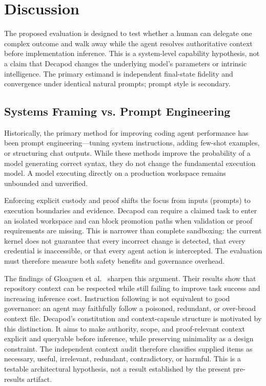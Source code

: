 \section{Discussion}
\label{sec:discussion}

The proposed evaluation is designed to test whether a human can delegate one complex outcome and walk away while the agent resolves authoritative context before implementation inference. This is a system-level capability hypothesis, not a claim that Decapod changes the underlying model's parameters or intrinsic intelligence. The primary estimand is independent final-state fidelity and convergence under identical natural prompts; prompt style is secondary.

\subsection{Systems Framing vs. Prompt Engineering}
Historically, the primary method for improving coding agent performance has been prompt engineering—tuning system instructions, adding few-shot examples, or structuring chat outputs. While these methods improve the probability of a model generating correct syntax, they do not change the fundamental execution model. A model executing directly on a production workspace remains unbounded and unverified.

Enforcing explicit custody and proof shifts the focus from inputs (prompts) to execution boundaries and evidence. Decapod can require a claimed task to enter an isolated workspace and can block promotion paths when validation or proof requirements are missing. This is narrower than complete sandboxing: the current kernel does not guarantee that every incorrect change is detected, that every credential is inaccessible, or that every agent action is intercepted. The evaluation must therefore measure both safety benefits and governance overhead.

The findings of Gloaguen et al.~\cite{gloaguen2026agentsmd} sharpen this argument. Their results show that repository context can be respected while still failing to improve task success and increasing inference cost. Instruction following is not equivalent to good governance: an agent may faithfully follow a poisoned, redundant, or over-broad context file. Decapod's constitution and context-capsule structure is motivated by this distinction. It aims to make authority, scope, and proof-relevant context explicit and queryable before inference, while preserving minimality as a design constraint. The independent context audit therefore classifies supplied items as necessary, useful, irrelevant, redundant, contradictory, or harmful. This is a testable architectural hypothesis, not a result established by the present pre-results artifact.

